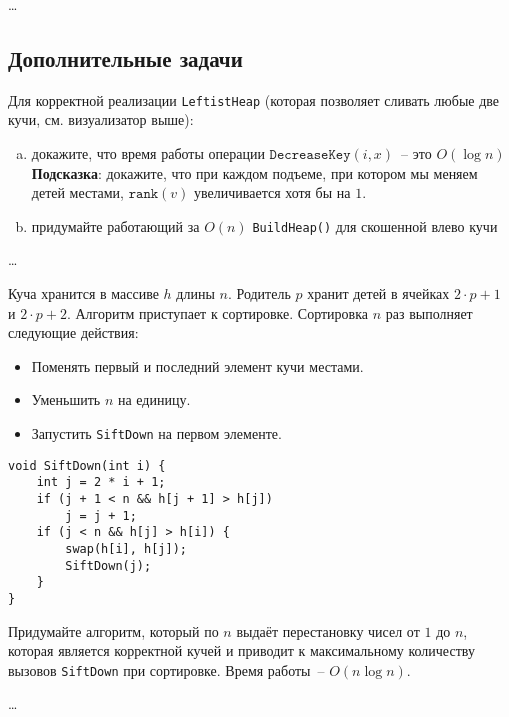 \begin{solution}
    \dots
\end{solution}


\subsection*{Дополнительные задачи}

\begin{problem}
    Для корректной реализации \texttt{LeftistHeap} (которая позволяет сливать любые две кучи, см. визуализатор выше):
    \begin{enumerate}[a)]
        \item докажите, что время работы операции $\mathtt{DecreaseKey}(i, x)$~-- это $O(\log n)$ \\
            {
                \footnotesize \textbf{Подсказка}: докажите, что при каждом подъеме, при котором мы меняем детей местами,
                $\mathtt{rank}(v)$ увеличивается хотя бы на $1$.
            }
        \item придумайте работающий за $O(n)$ \texttt{BuildHeap()} для скошенной влево кучи
    \end{enumerate}
\end{problem}

\begin{solution}
    \dots
\end{solution}


\begin{problem}
    Куча хранится в массиве $h$ длины $n$. Родитель $p$ хранит детей в ячейках $2 \cdot p + 1$ и $2 \cdot p + 2$.
    Алгоритм приступает к сортировке. Сортировка $n$ раз выполняет следующие действия:
    \begin{itemize}
        \item Поменять первый и последний элемент кучи местами.
        \item Уменьшить $n$ на единицу.
        \item Запустить \texttt{SiftDown} на первом элементе.
    \end{itemize}

    {
        \normalfont\begin{lstlisting}
void SiftDown(int i) {
    int j = 2 * i + 1;
    if (j + 1 < n && h[j + 1] > h[j])
        j = j + 1;
    if (j < n && h[j] > h[i]) {
        swap(h[i], h[j]);
        SiftDown(j);
    }
}
        \end{lstlisting}
    }

    Придумайте алгоритм, который по $n$ выдаёт перестановку чисел от $1$ до $n$, которая является корректной кучей
    и приводит к максимальному количеству вызовов \texttt{SiftDown} при сортировке. Время работы~-- $O(n \log n)$.
\end{problem}

\begin{solution}
    \dots
\end{solution}


\clearpage
